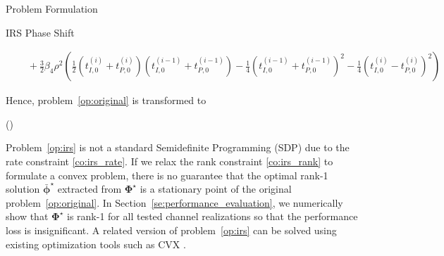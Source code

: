 \documentclass[journal]{IEEEtran}
\begin{document}
\begin{section}{Problem Formulation}
\begin{subsection}{IRS Phase Shift}
\begin{figure*}[b]
\begin{equation}
\begin{split}
						& \quad + \frac{3}{2}{\beta_4}{\rho^2} \left(\frac{1}{2}(t_{I,0}^{(i)} + t_{P,0}^{(i)})(t_{I,0}^{(i-1)} + t_{P,0}^{(i-1)}) - \frac{1}{4}(t_{I,0}^{(i-1)} + t_{P,0}^{(i-1)})^2 - \frac{1}{4}(t_{I,0}^{(i)} - t_{P,0}^{(i)})^2\right)
					\end{split}
				\end{equation}
			\end{figure*}
			Hence, problem~\ref{op:original} is transformed to
			\begin{maxi!}
				{\boldsymbol{\Phi}}{(\boldsymbol{\Phi})}{\label{op:irs}}{\label{ob:irs}}
				\label{co:irs_rate}
				\label{co:irs_modulus}
			\end{maxi!}

			Problem~\ref{op:irs} is not a standard Semidefinite Programming (SDP) due to the rate constraint \ref{co:irs_rate}. If we relax the rank constraint \ref{co:irs_rank} to formulate a convex problem, there is no guarantee that the optimal rank-\num{1} solution $\bar{\boldsymbol{\phi}}^{\star}$ extracted from $\boldsymbol{\Phi}^{\star}$ is a stationary point of the original problem~\ref{op:original}. In Section~\ref{se:performance_evaluation}, we numerically show that $\boldsymbol{\Phi}^{\star}$ is rank-\num{1} for all tested channel realizations so that the performance loss is insignificant. A related version of problem~\ref{op:irs} can be solved using existing optimization tools such as CVX \cite{Grant2013}.


\end{subsection}
\end{section}
\end{document}
